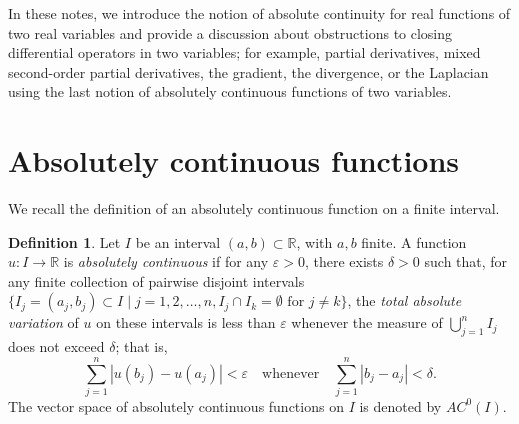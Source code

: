 \documentclass[11pt,leqno]{article}
\theoremstyle{plain}
\theoremstyle{definition}
\newtheorem{definition/}[lem]{Definition}
\newenvironment{definition}
  {\renewcommand{\qedsymbol}{\textdagger}%
   \pushQED{\qed}\begin{definition/}}
  {\popQED\end{definition/}}
\numberwithin{equation}{section}
\numberwithin{lem}{section}
\begin{document}
In these notes, we introduce the notion of absolute continuity for real functions of two real variables and provide a discussion about obstructions to closing differential operators in two variables; for example, partial derivatives, mixed second-order partial derivatives, the gradient, the divergence, or the Laplacian using the last notion of absolutely continuous functions of two variables.
\section{Absolutely continuous functions}
We recall the definition of an absolutely continuous function on a finite interval.
\begin{definition}
    Let $I$ be an interval $(a,b)\subset \mathbb R$, with $a,b$ finite. A function $u\colon I\to \mathbb R$ is \textit{absolutely continuous} if for any $\varepsilon>0$, there exists $\delta >0$ such that, for any finite collection of pairwise disjoint intervals $\{I_j = (a_j,b_j)\subset I \mid j = 1,2,\dots,n, I_j\cap I_k = \emptyset \text{ for } j\neq k\}$, the \textit{total absolute variation} of $u$ on these intervals is less than $\varepsilon$ whenever the measure of $\bigcup_{j=1}^n I_j$ does not exceed $\delta$; that is,
\begin{equation}\label{1}
    \sum_{j=1}^n|u(b_j)-u(a_j)|<\varepsilon\quad\text{whenever}\quad \sum_{j=1}^n |b_j-a_j| < \delta.
\end{equation}
The vector space of absolutely continuous functions on $I$ is denoted by $AC^0(I)$.
\end{definition}
\end{document}
